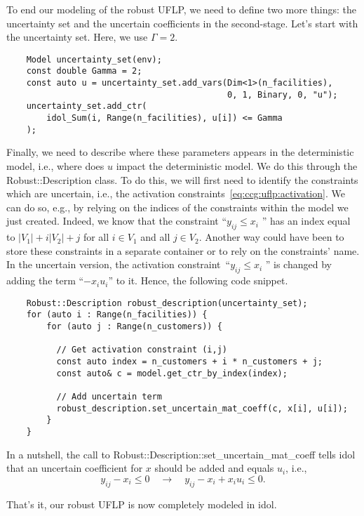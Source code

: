 To end our modeling of the robust UFLP, we need to define two more things: the
uncertainty set and the uncertain coefficients in the second-stage. Let's
start with the uncertainty set. Here, we use $\Gamma = 2$.
%
\begin{lstlisting}
    Model uncertainty_set(env);
    const double Gamma = 2;
    const auto u = uncertainty_set.add_vars(Dim<1>(n_facilities), 
                                            0, 1, Binary, 0, "u");
    uncertainty_set.add_ctr(
        idol_Sum(i, Range(n_facilities), u[i]) <= Gamma
    );
\end{lstlisting}
Finally, we need to describe where these parameters appears in the
deterministic model, i.e., where does $u$ impact the deterministic model. We
do this through the \textsf{Robust::Description} class. To do this, we will
first need to identify the constraints which are uncertain, i.e., the
activation constraints~\eqref{eq:ccg:uflp:activation}. We can do so, e.g., by
relying on the indices of the constraints within the model we just created.
Indeed, we know that the constraint ``$y_{ij} \le x_i$ '' has an index equal
to $|V_1| + i|V_2| + j$ for all $i\in V_1$ and all $j\in V_2$. Another way
could have been to store these constraints in a separate container or to rely
on the constraints' name. In the uncertain version, the activation
constraint~``$y_{ij} \le x_i$ '' is changed by adding the term ``$- x_i u_i$''
to it. Hence, the following code snippet.
%
\begin{lstlisting}
    Robust::Description robust_description(uncertainty_set);
    for (auto i : Range(n_facilities)) {
        for (auto j : Range(n_customers)) {
            
          // Get activation constraint (i,j)
          const auto index = n_customers + i * n_customers + j;
          const auto& c = model.get_ctr_by_index(index);

          // Add uncertain term
          robust_description.set_uncertain_mat_coeff(c, x[i], u[i]);
        }
    }
\end{lstlisting}
In a nutshell, the call to
\textsf{Robust::Description::set\_uncertain\_mat\_coeff} tells idol that an
uncertain coefficient for $x$ should be added and equals $u_i$, i.e., 
\begin{equation*}
    y_{ij} - x_i \le 0 \quad \longrightarrow \quad y_{ij} - x_i + x_iu_i \le 0.
\end{equation*}

That's it, our robust UFLP is now completely modeled in \textsf{idol}.

